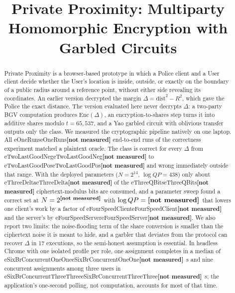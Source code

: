\documentclass[conference,letterpaper]{IEEEtran}
\newcommand{\num}[1]{\ifcsname #1\endcsname\csname #1\endcsname\else\textbf{[not measured]}\fi}
\begin{document}
\title{Private Proximity: Multiparty Homomorphic Encryption with Garbled Circuits}

\author{
}
\maketitle

\begin{abstract}
Private Proximity is a browser-based prototype in which a Police client and a User client decide whether the User's location is inside, outside, or exactly on the boundary of a public radius around a reference point, without either side revealing its coordinates. An earlier version decrypted the margin $\Delta = \text{dist}^2 - R^2$, which gave the Police the exact distance. The version evaluated here never decrypts $\Delta$: a two-party BGV computation produces $\mathrm{Enc}(\Delta)$, an encryption-to-shares step turns it into additive shares modulo $t = 65{,}537$, and a Yao garbled circuit with oblivious transfer outputs only the class. We measured the cryptographic pipeline natively on one laptop. All \num{eOneRuns} end-to-end runs of the correctness experiment matched a plaintext oracle. The class is correct for every $\Delta$ from \num{eTwoLastGoodNeg} to \num{eTwoLastGoodPos} and wrong immediately outside that range. With the deployed parameters ($N = 2^{14}$, $\log QP = 438$) only about \num{eThreeDelta} of the \num{eThreeQBits} ciphertext-modulus bits are consumed, and a parameter sweep found a correct set at $N = 2^{\num{eFourBestN}}$ with $\log QP = \num{eFourBestQP}$ that lowers one client's work by a factor of \num{eFourSpeedClient} and the server's by \num{eFourSpeedServer}. We also report two limits: the noise-flooding term of the share conversion is smaller than the ciphertext noise it is meant to hide, and a garbler that deviates from the protocol can recover $\Delta$ in 17 executions, so the semi-honest assumption is essential. In headless Chrome with one isolated profile per role, one assignment completes in a median of \num{eSixBrConcurrentOneOne}~s and nine concurrent assignments among three users in \num{eSixBrConcurrentThreeThree}~s; the application's one-second polling, not computation, accounts for most of that time.
\end{abstract}
\end{document}
